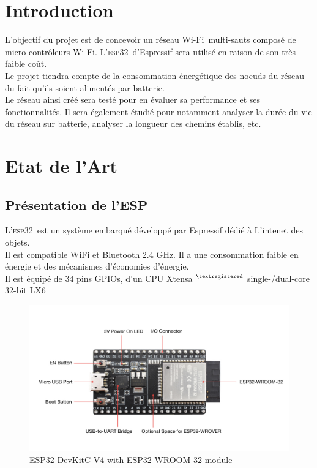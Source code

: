 \documentclass[a4paper, 12pt]{report}
\newcommand{\esp}{\textsc{esp32}}
\newcommand{\wifi}{Wi-Fi}
\begin{document}
\chapter*{Introduction}
    L'objectif du projet est de concevoir un réseau \wifi\ multi-sauts composé 
    de micro-contrôleurs \wifi. L'\esp\ d'Espressif sera utilisé en raison de 
    son très faible coût.\\
    Le projet tiendra compte de la consommation énergétique des noeuds du 
    réseau du fait qu'ils soient alimentés par batterie.\\
    Le réseau ainsi créé sera testé pour en évaluer sa performance et ses fonctionnalités. 
    Il sera également étudié pour notamment analyser la durée du vie du réseau 
    sur batterie, analyser la longueur des chemins établis, etc.

\tableofcontents
\newpage

\chapter{Etat de l'Art}
\section{Présentation de l'ESP}
    L'\esp\ est un système embarqué développé par Espressif dédié à L'intenet des objets.\\
    Il est compatible WiFi et Bluetooth 2.4 GHz. Il a une consommation faible en énergie et
    des mécanismes d'économies d'énergie.\\
    Il est équipé de 34 pins GPIOs, d'un CPU Xtensa $^{\tiny{\textregistered}}$ single-/dual-core 32-bit LX6
    \begin{figure}[H]
        \centering
        \includegraphics[scale=0.4]{images/esp32-devkitc.jpg}
        \caption{ESP32-DevKitC V4 with ESP32-WROOM-32 module \cite{esp32-gettingStarted_w}}
        \label{esp32_img}
    \end{figure}
\end{document}
